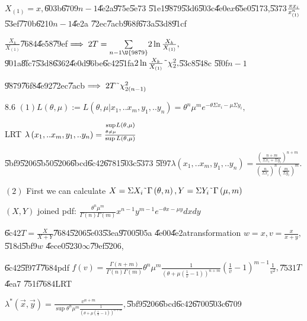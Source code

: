\documentclass{article}
\begin{document}
$X_{\left( 1\right) }=x,$\U{603b}\U{6709}$n-1$\U{4e2a}\U{975e}\U{5e73}%
\U{51e1}\U{9879}\U{53d6}\U{503c}\U{4e0e}$x$\U{65e0}\U{5173},\U{5373}$\frac{%
\pi x_{i}}{x_{\left( 1\right) }^{n}}$\U{53ef}\U{770b}\U{6210}$n-1$\U{4e2a}%
\U{72ec}\U{7acb}\U{968f}\U{673a}\U{53d8}\U{91cf}

$\frac{X_{k}}{X_{\left( 1\right) }}$\U{7684}\U{4e58}\U{79ef}$\implies 2T=%
\underset{n-1\U{9879} }{\sum }2\ln \frac{X_{k}}{X_{\left( 1\right) }},$%
\U{901a}\U{8fc7}\U{53d8}\U{6362}\U{4e0d}\U{96be}\U{6c42}\U{51fa}$2\ln \frac{%
X_{k}}{X_{\left( 1\right) }}\symbol{126}\chi _{2}^{2},$\U{53c8}\U{548c}%
\U{5f0f}$n-1$

\U{9879}\U{76f8}\U{4e92}\U{72ec}\U{7acb}$\implies 2T\symbol{126}\chi
_{2\left( n-1\right) }^{2}$

8.6 $\left( 1\right) L\left( \theta ,\mu \right) :=L\left( \theta ,\mu
|x_{1},..x_{m},y_{1},..y_{n}\right) =\theta ^{n}\mu ^{m}e^{-\theta \Sigma
x_{i}-\mu \Sigma y_{i}},$

\bigskip LRT $\lambda \left( x_{1},..x_{m},y_{1},..y_{n}\right) =\frac{%
\underset{\theta \neq \mu }{\sup }L\left( \theta ,\mu \right) }{\sup L\left(
\theta ,\mu \right) }$

\U{5bf9}\U{5206}\U{5b50}\U{5206}\U{6bcd}\U{6c42}\U{6781}\U{503c}\U{5373}%
\U{5f97}$\lambda \left( x_{1},..x_{m},y_{1},..y_{n}\right) =\frac{\left( 
\frac{n+m}{\Sigma x_{i}+\Sigma y_{i}}\right) ^{n+m}}{\left( \frac{n}{\Sigma
x_{i}}\right) ^{n}\left( \frac{m}{\Sigma y_{i}}\right) ^{m}}.$

$\left( 2\right) $ First we can calculate $X=\Sigma X_{i}\symbol{126}\Gamma
\left( \theta ,n\right) ,Y=\Sigma Y_{i}\symbol{126}\Gamma \left( \mu
,m\right) $

$\left( X,Y\right) $ joined pdf: $\frac{\theta ^{n}\mu ^{m}}{\Gamma \left(
n\right) \Gamma \left( m\right) }x^{n-1}y^{m-1}e^{-\theta x-\mu y}dxdy$

\U{6c42}$T=\frac{X}{X+Y}$\U{7684}\U{5206}\U{5e03}\U{53ea}\U{9700}\U{505a}%
\U{4e00}\U{4e2a}transformation $w=x,v=\frac{x}{x+y},$\U{518d}\U{5bf9}$w$%
\U{4ece}0\U{5230}$\infty $\U{79ef}\U{5206},

\U{6c42}\U{5f97}$T$\U{7684}pdf $f\left( v\right) =\frac{\Gamma \left(
n+m\right) }{\Gamma \left( n\right) \Gamma \left( m\right) }\theta ^{n}\mu
^{m}\frac{1}{\left( \theta +\mu \left( \frac{1}{v}-1\right) \right) ^{n+m}}%
\left( \frac{1}{v}-1\right) ^{m-1}\frac{1}{v^{2}},$\U{7531}$T$\U{4ea7}%
\U{751f}\U{7684}LRT

$\lambda ^{\ast }\left( \vec{x},\vec{y}\right) =\frac{v^{n+m}}{\sup \theta
^{n}\mu ^{m}\frac{1}{\left( \theta +\mu \left( \frac{1}{v}-1\right) \right)
^{n+m}}},$\U{5bf9}\U{5206}\U{6bcd}\U{6c42}\U{6700}\U{503c}\U{6709}
\end{document}
